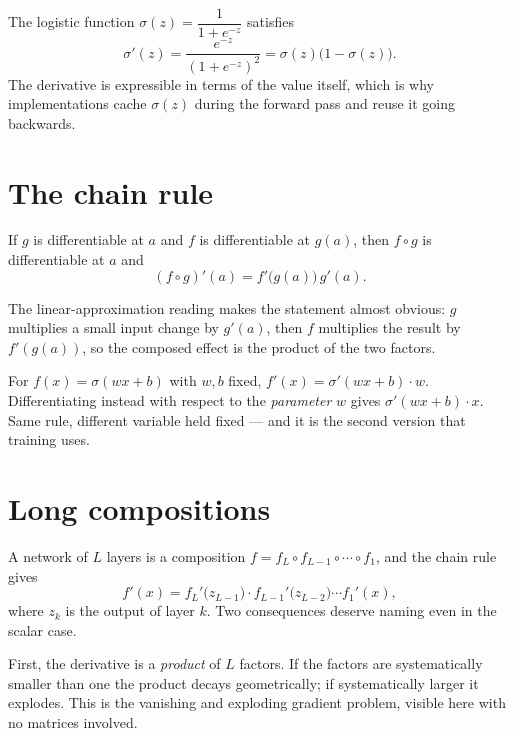 \begin{example}
The logistic function \(\sigma(z)=\dfrac{1}{1+e^{-z}}\) satisfies
\[
	\sigma'(z)=\frac{e^{-z}}{(1+e^{-z})^{2}}=\sigma(z)\bigl(1-\sigma(z)\bigr).
\]
The derivative is expressible in terms of the value itself, which is why
implementations cache \(\sigma(z)\) during the forward pass and reuse it going
backwards.
\end{example}

\section{The chain rule}

\begin{theorem}
If \(g\) is differentiable at \(a\) and \(f\) is differentiable at \(g(a)\), then
\(f\circ g\) is differentiable at \(a\) and
\[
	(f\circ g)'(a)=f'\bigl(g(a)\bigr)\,g'(a).
\]
\end{theorem}

The linear-approximation reading makes the statement almost obvious: \(g\)
multiplies a small input change by \(g'(a)\), then \(f\) multiplies the result by
\(f'(g(a))\), so the composed effect is the product of the two factors.

\begin{example}
For \(f(x)=\sigma(wx+b)\) with \(w,b\) fixed,
\(f'(x)=\sigma'(wx+b)\cdot w\). Differentiating instead with respect to the
\emph{parameter} \(w\) gives \(\sigma'(wx+b)\cdot x\). Same rule, different
variable held fixed --- and it is the second version that training uses.
\end{example}


\section{Long compositions}

A network of \(L\) layers is a composition
\(f=f_L\circ f_{L-1}\circ\cdots\circ f_1\), and the chain rule gives
\[
	f'(x)=f_L'\bigl(z_{L-1}\bigr)\cdot f_{L-1}'\bigl(z_{L-2}\bigr)\cdots f_1'(x),
\]
where \(z_k\) is the output of layer \(k\). Two consequences deserve naming even
in the scalar case.

First, the derivative is a \emph{product} of \(L\) factors. If the factors are
systematically smaller than one the product decays geometrically; if
systematically larger it explodes. This is the vanishing and exploding gradient
problem, visible here with no matrices involved.

